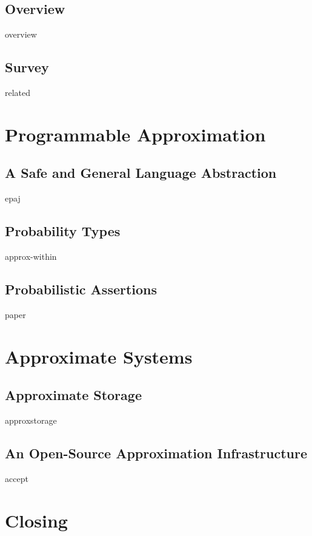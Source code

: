 \documentclass[ twoside,openright,titlepage,numbers=noenddot,headinclude,
                footinclude=true,cleardoublepage=empty,abstractoff,%
                BCOR=5mm,paper=letter,fontsize=11pt,letterpaper,%
                american,%
                ]{scrreprt}
\begin{document}
\chapter{Overview}
\label{ch:overview}
{overview}

\chapter{Survey}
\label{ch:related}
{related}


\part{Programmable Approximation}
\label{part:programming}

\chapter{A Safe and General Language Abstraction}
\label{ch:enerj}
{epaj}


\chapter{Probability Types}
\label{ch:decaf}
{approx-within}


\chapter{Probabilistic Assertions}
\label{ch:passert}
{paper}



\part{Approximate Systems}
\label{part:systems}

\chapter{Approximate Storage}
\label{ch:approxstorage}
{approxstorage}


\chapter{An Open-Source Approximation Infrastructure}
\label{ch:accept}
{accept}


\part{Closing}
\label{part:conclusion}
\end{document}
